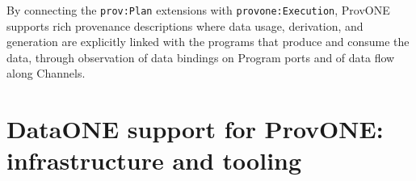 \documentclass[a4paper]{llncs}
\begin{document}
By connecting the \texttt{prov:Plan} extensions with \texttt{provone:Execution}, ProvONE supports rich provenance descriptions where data usage, derivation, and generation are explicitly linked with the programs that produce and consume the data, through observation of data bindings on Program ports and of data flow along Channels.


\section{DataONE support for ProvONE:  infrastructure and tooling}







\end{document}
